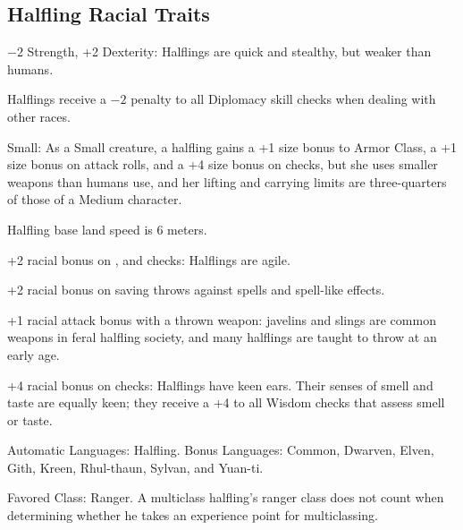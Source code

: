 \subsection{Halfling Racial Traits}
\begin{itemize*}
    \item $-2$ Strength, +2 Dexterity: Halflings are quick and stealthy, but weaker than humans.
    \item Halflings receive a $-2$ penalty to all Diplomacy skill checks when dealing with other races.
    \item Small: As a Small creature, a halfling gains a +1 size bonus to Armor Class, a +1 size bonus on attack rolls, and a +4 size bonus on  checks, but she uses smaller weapons than humans use, and her lifting and carrying limits are three-quarters of those of a Medium character.%
    \item Halfling base land speed is 6 meters.
    \item +2 racial bonus on ,  and  checks: Halflings are agile.
    \item +2 racial bonus on saving throws against spells and spell-like effects.
    \item +1 racial attack bonus with a thrown weapon: javelins and slings are common weapons in feral halfling society, and many halflings are taught to throw at an early age.
    \item +4 racial bonus on  checks: Halflings have keen ears. Their senses of smell and taste are equally keen; they receive a +4 to all Wisdom checks that assess smell or taste.
    \item Automatic Languages: Halfling. Bonus Languages: Common, Dwarven, Elven, Gith, Kreen, Rhul-thaun, Sylvan, and Yuan-ti.
    \item Favored Class: Ranger. A multiclass halfling's ranger class does not count when determining whether he takes an experience point for multiclassing.
\end{itemize*}